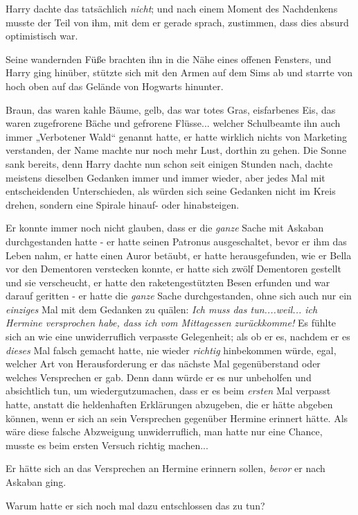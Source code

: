 {Harry dachte das tatsächlich \emph{nicht}; und nach einem Moment des Nachdenkens musste der Teil von ihm, mit dem er gerade sprach, zustimmen, dass dies absurd optimistisch war.

Seine wandernden Füße brachten ihn in die Nähe eines offenen Fensters, und Harry ging hinüber, stützte sich mit den Armen auf dem Sims ab und starrte von hoch oben auf das Gelände von Hogwarts hinunter.

Braun, das waren kahle Bäume, gelb, das war totes Gras, eisfarbenes Eis, das waren zugefrorene Bäche und gefrorene Flüsse... welcher Schulbeamte ihn auch immer „Verbotener Wald“ genannt hatte, er hatte wirklich nichts von Marketing verstanden, der Name machte nur noch mehr Lust, dorthin zu gehen. Die Sonne sank bereits, denn Harry dachte nun schon seit einigen Stunden nach, dachte meistens dieselben Gedanken immer und immer wieder, aber jedes Mal mit entscheidenden Unterschieden, als würden sich seine Gedanken nicht im Kreis drehen, sondern eine Spirale hinauf- oder hinabsteigen.

Er konnte immer noch nicht glauben, dass er die \emph{ganze} Sache mit Askaban durchgestanden hatte - er hatte seinen Patronus ausgeschaltet, bevor er ihm das Leben nahm, er hatte einen Auror betäubt, er hatte herausgefunden, wie er Bella vor den Dementoren verstecken konnte, er hatte sich zwölf Dementoren gestellt und sie verscheucht, er hatte den raketengestützten Besen erfunden und war darauf geritten - er hatte die \emph{ganze} Sache durchgestanden, ohne sich auch nur ein \emph{einziges} Mal mit dem Gedanken zu quälen: \emph{Ich muss das tun....weil... ich Hermine versprochen habe, dass ich vom Mittagessen zurückkomme!} Es fühlte sich an wie eine unwiderruflich verpasste Gelegenheit; als ob er es, nachdem er es \emph{dieses} Mal falsch gemacht hatte, nie wieder \emph{richtig} hinbekommen würde, egal, welcher Art von Herausforderung er das nächste Mal gegenüberstand oder welches Versprechen er gab. Denn dann würde er es nur unbeholfen und absichtlich tun, um wiedergutzumachen, dass er es beim \emph{ersten} Mal verpasst hatte, anstatt die heldenhaften Erklärungen abzugeben, die er hätte abgeben können, wenn er sich an sein Versprechen gegenüber Hermine erinnert hätte. Als wäre diese falsche Abzweigung unwiderruflich, man hatte nur eine Chance, musste es beim ersten Versuch richtig machen...

Er hätte sich an das Versprechen an Hermine erinnern sollen, \emph{bevor} er nach Askaban ging.

Warum hatte er sich noch mal dazu entschlossen das zu tun?

}
